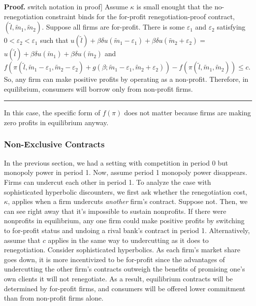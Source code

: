 \documentclass[11pt]{article}%
\newenvironment{proof}[1][Proof]{\noindent\textbf{#1.} }{\ \rule{0.5em}{0.5em}}
\begin{document}
\begin{proof}
\lbrack switch notation in proof] Assume $\kappa$ is small enought that the
no-renegotiation constraint binds for the for-profit renegotiation-proof
contract, $\left(  \tilde{l},\tilde{m}_{1},\tilde{m}_{2}\right)  $. Suppose
all firms are for-profit. There is some $\varepsilon_{1}$ and $\varepsilon
_{2}$ satisfying $0<\varepsilon_{2}<\varepsilon_{1}$ such that $u\left(
\tilde{l}\right)  +\beta\delta u\left(  \tilde{m}_{1}-\varepsilon_{1}\right)
+\beta\delta u\left(  \tilde{m}_{2}+\varepsilon_{2}\right)  =$ $u\left(
\tilde{l}\right)  +\beta\delta u\left(  \tilde{m}_{1}\right)  +\beta\delta
u\left(  \tilde{m}_{2}\right)  $ and $f\left(  \pi\left(  \tilde{l},\tilde
{m}_{1}-\varepsilon_{1},\tilde{m}_{2}-\varepsilon_{2}\right)  +g\left(
\beta;\tilde{m}_{1}-\varepsilon_{1},\tilde{m}_{2}+\varepsilon_{2}\right)
\right)  -f\left(  \pi\left(  \tilde{l},\tilde{m}_{1},\tilde{m}_{2}\right)
\right)  \leq c$. So, any firm can make positive profits by operating as a
non-profit. Therefore, in equilibrium, consumers will borrow only from
non-profit firms.
\end{proof}

In this case, the specific form of $f\left(  \pi\right)  $ does not matter
because firms are making zero profits in equilibrium anyway.

\subsubsection{Non-Exclusive Contracts}

In the previous section, we had a setting with competition in period 0 but
monopoly power in period 1. Now, assume period 1 monopoly power disappears.
Firms can undercut each other in period 1. To analyze the case with
sophisticated hyperbolic discounters, we first ask whether the renegotiation
cost, $\kappa$, applies when a firm undercuts \textit{another} firm's
contract. Suppose not. Then, we can see right away that it's impossible to
sustain nonprofits. If there were nonprofits in equilibrium, any one firm
could make positive profits by switching to for-profit status and undoing a
rival bank's contract in period 1. Alternatively, assume that $c$ applies in
the same way to undercutting as it does to renegotiation. Consider
sophisticated hyperbolics. As each firm's market share goes down, it is more
incentivized to be for-profit since the advantages of undercutting the other
firm's contracts outweigh the benefits of promising one's own clients it will
not renegotiate. As a result, equilibrium contracts will be determined by
for-profit firms, and consumers will be offered lower commitment than from
non-profit firms alone.
\end{document}
